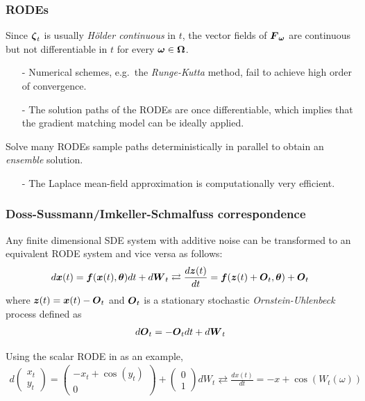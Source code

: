 \begin{frame}[t]
    \frametitle{RODEs}
    Since $\boldsymbol{\zeta}_t$ is usually \emph{H{\"o}lder continuous} in $t$, the vector fields of $\boldsymbol{F}_{\boldsymbol{\omega}}$ are continuous but not differentiable in $t$ for every $\boldsymbol{\omega} \in \boldsymbol{\Omega}$.
    \begin{itemize}
        \item[-] Numerical schemes, e.g.\ the \emph{Runge-Kutta} method, fail to achieve high order of convergence.
        \item[-] The solution paths of the RODEs are once differentiable, which implies that the gradient matching model can be ideally applied.
    \end{itemize}
    
    \vspace{1\baselineskip}
    Solve many RODEs sample paths deterministically in parallel to obtain an \emph{ensemble} solution.
    \begin{itemize}
        \item[-] The Laplace mean-field approximation is computationally very efficient.
    \end{itemize}
\end{frame}

\begin{frame}[t]
    \frametitle{Doss-Sussmann/Imkeller-Schmalfuss correspondence}
    Any finite dimensional SDE system with additive noise can be transformed to an equivalent RODE system and vice versa as follows:
    \begin{align}
        d\boldsymbol{x}(t) = \boldsymbol{f}(\boldsymbol{x}(t), \boldsymbol{\theta})dt + d\boldsymbol{W}_t 
        \rightleftarrows
        \frac{d\boldsymbol{z}(t)}{dt} = \boldsymbol{f}(\boldsymbol{z}(t) + \boldsymbol{O}_t, \boldsymbol{\theta}) + \boldsymbol{O}_t
        \label{eq-rode-sde}
    \end{align}
    where $\boldsymbol{z}(t) = \boldsymbol{x}(t) - \boldsymbol{O}_t$ and $\boldsymbol{O}_t$ is a stationary stochastic \emph{Ornstein-Uhlenbeck} process defined as
    \begin{align}
        d\boldsymbol{O}_t = -\boldsymbol{O}_tdt + d\boldsymbol{W}_t
    \end{align}
    
    \vspace{\baselineskip}
    Using the scalar RODE in  as an example,
    \begin{align}
        d\begin{pmatrix}
            x_t 
            \\ 
            y_t
        \end{pmatrix}
        = 
        \begin{pmatrix}
            -x_t + \cos{(y_t)}
            \\
            0
        \end{pmatrix}
        + 
        \begin{pmatrix}
            0
            \\
            1
        \end{pmatrix}
        dW_t
        \rightleftarrows  
        \frac{dx(t)}{dt} = -x + \cos{(W_t(\omega))}
    \end{align}
\end{frame}

